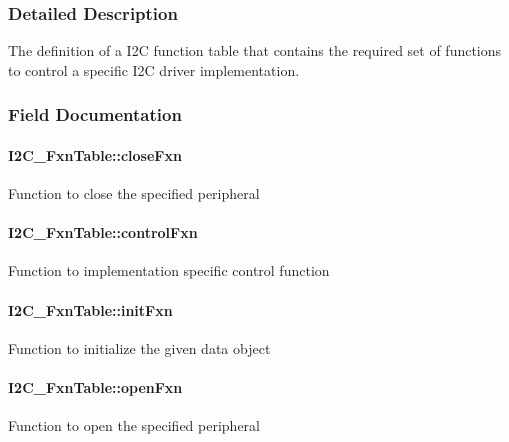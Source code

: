 \subsubsection{Detailed Description}
The definition of a I2\+C function table that contains the required set of functions to control a specific I2\+C driver implementation. 

\subsubsection{Field Documentation}
\paragraph[{close\+Fxn}]{ I2\+C\+\_\+\+Fxn\+Table\+::close\+Fxn}\label{struct_i2_c___fxn_table_a02f4e6a7daeb64d6741372a5636eedb5}
Function to close the specified peripheral 
\paragraph[{control\+Fxn}]{ I2\+C\+\_\+\+Fxn\+Table\+::control\+Fxn}\label{struct_i2_c___fxn_table_af23db6bdc9b619633fb70ddff44412ea}
Function to implementation specific control function 
\paragraph[{init\+Fxn}]{ I2\+C\+\_\+\+Fxn\+Table\+::init\+Fxn}\label{struct_i2_c___fxn_table_ae27540a7175c9ad14b590ddc92e06390}
Function to initialize the given data object 
\paragraph[{open\+Fxn}]{ I2\+C\+\_\+\+Fxn\+Table\+::open\+Fxn}\label{struct_i2_c___fxn_table_afb8c5f67ba6d0941f6265707083b16f8}
Function to open the specified peripheral 
